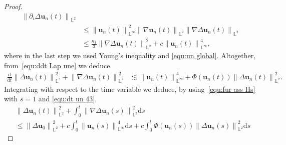 \documentclass[11pt,reqno]{amsart}
\theoremstyle{definition}
\numberwithin{equation}{section}
\newcommand{\bff}{\boldsymbol}
\newcommand{\bb}{\mathbb}
\newcommand{\ddt}{\frac{\mathrm{d}}{\mathrm{d}t}}
\newcommand{\ds}{\mathrm{d}s}
\newcommand{\pa}{\partial}
\newcommand{\nn}{\nonumber}
\newcommand{\norm}[2]{\left\|{#1}\right\|_{#2}}
\begin{document}
\begin{proof}
\begin{align*}
	\norm{\pa_i\Delta\bff{u}_n(t)}{\bb{L}^2}
	\\
	\nn
	&\le
	\norm{\bff{u}_n(t)}{\bb{L}^\infty}^2
	\norm{\nabla\bff{u}_n(t)}{\bb{L}^2}
	\norm{\nabla\Delta\bff{u}_n(t)}{\bb{L}^2}
	\\
	&\leq
	\frac{\kappa_1}{3} \norm{\nabla\Delta\bff{u}_n(t)}{\bb{L}^2}^2
	+
	c \norm{\bff{u}_n(t)}{\bb{L}^\infty}^4,
\end{align*}
where in the last step we used Young's inequality and \eqref{equ:un global}.
Altogether, from~\eqref{equ:ddt Lap une} we deduce 
\begin{align*}
	\ddt{}\norm{\Delta\bff{u}_n(t)}{\bb{L}^2}^2
	+
	\norm{\nabla\Delta\bff{u}_n(t)}{\bb{L}^2}^2
	&\lesssim
	\norm{\bff{u}_n(t)}{\bb{L}^\infty}^4
	+
	\Phi(\bff{u}_n(t))
	\norm{\Delta\bff{u}_n(t)}{\bb{L}^2}^2.
\end{align*}
Integrating with respect to
the time variable we deduce, by using~\eqref{equ:fur ass Hs} with $s=1$ and \eqref{equ:dt un 43},
\begin{align}\label{equ:ineq Delta une}
	&\norm{\Delta\bff{u}_n(t)}{\bb{L}^2}^2
	+
	\int_0^t
	\norm{\nabla\Delta\bff{u}_n(s)}{\bb{L}^2}^2\ds
	\nn\\
	&\leq
	\norm{\Delta \bff{u}_0}{\bb{L}^2}^2
	+
	c\int_0^t \norm{\bff{u}_n(s)}{\bb{L}^\infty}^4 \ds
	+
	c\int_0^t
	\Phi(\bff{u}_n(s))
	\norm{\Delta\bff{u}_n(s)}{\bb{L}^2}^2
	\ds

\end{align}
\end{proof}
\end{document}
